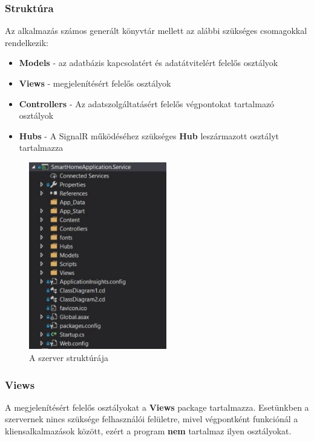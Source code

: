 \documentclass[a4paper,12pt]{report}
\begin{document}
    \subsubsection{Struktúra}
    Az alkalmazás számos generált könyvtár mellett az alábbi szükséges csomagokkal rendelkezik:

    \begin{itemize}
        \item \textbf{Models} - az adatbázis kapcsolatért és adatátvitelért felelős osztályok
        \item \textbf{Views} - megjelenítésért felelős osztályok
        \item \textbf{Controllers} - Az adatszolgáltatásért felelős végpontokat tartalmazó osztályok
        \item \textbf{Hubs} - A SignalR működéséhez szükséges \textbf{Hub} leszármazott osztályt tartalmazza
    \end{itemize}

    \begin{figure}[H]
        \centering
        \includegraphics[width=6cm,keepaspectratio]{images/servicestructure.jpg}
        \caption{A szerver struktúrája}
        \label{fig: ServiceStructure}
    \end{figure}

    \subsubsection{Views}
    A megjelenítésért felelős osztályokat a \textbf{Views} package tartalmazza. Esetünkben a szervernek nincs szüksége
    felhasználói felületre, mivel végpontként funkciónál a kliensalkalmazások között, ezért a program \textbf{nem} tartalmaz
    ilyen osztályokat.
\end{document}
